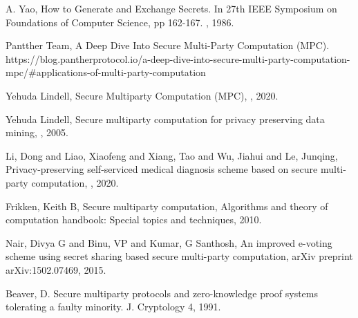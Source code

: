 \documentclass[12pt]{article}
\begin{document}
\begin{thebibliography}{10}

A. Yao, How to Generate and Exchange Secrets. In 27th IEEE Symposium on Foundations of Computer Science,
\newblock pp 162-167.
, 1986.

Pantther Team, A Deep Dive Into Secure Multi-Party Computation (MPC).
\newblock https://blog.pantherprotocol.io/a-deep-dive-into-secure-multi-party-computation-mpc/\#applications-of-multi-party-computation

Yehuda Lindell, Secure Multiparty Computation (MPC),
, 2020.

Yehuda Lindell, Secure multiparty computation for privacy preserving data mining,
, 2005.

Li, Dong and Liao, Xiaofeng and Xiang, Tao and Wu, Jiahui and Le, Junqing, Privacy-preserving self-serviced medical diagnosis scheme based on secure multi-party computation,
, 2020.

Frikken, Keith B, Secure multiparty computation,
\newblock Algorithms and theory of computation handbook: Special topics and techniques, 2010.

Nair, Divya G and Binu, VP and Kumar, G Santhosh, An improved e-voting scheme using secret sharing based secure multi-party computation,
\newblock arXiv preprint arXiv:1502.07469, 2015.

Beaver, D. Secure multiparty protocols and zero-knowledge proof systems tolerating a faulty minority.
\newblock J. Cryptology 4, 1991.

\end{thebibliography}
\end{document}
